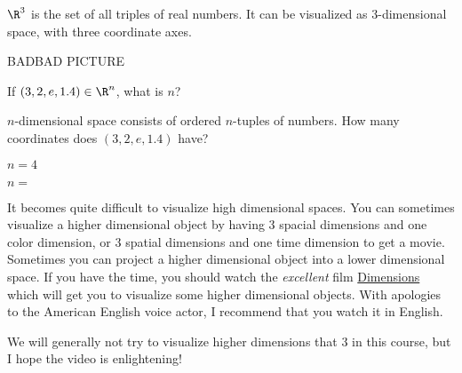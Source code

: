 \documentclass{ximera}
\begin{document}
\begin{example}
	$\R^3$ is the set of all triples of real numbers.  It can be visualized as $3$-dimensional space, with three coordinate axes. 
	
	BADBAD PICTURE
\end{example}


\begin{question}
	If $(3,2,e,1.4) \in \R^n$, what is $n$?
	\begin{solution}
		\begin{hint}
		$n$-dimensional space consists of ordered $n$-tuples of numbers.  How many coordinates does $(3,2,e,1.4)$ have?
		\end{hint}
		\begin{hint}
			$n=4$
		\end{hint}
	$n = $
	\end{solution}
\end{question}

It becomes quite difficult to visualize high dimensional spaces.  
You can sometimes visualize a higher dimensional object by having $3$ spacial dimensions and one color dimension, or $3$ spatial dimensions and one time 
dimension to get a movie.  Sometimes you can project a higher dimensional object into a lower dimensional space.  If you have the time, you should watch the 
\textit{excellent} film \href{http://www.dimensions-math.org/}{Dimensions}  which will get you to visualize some higher dimensional objects.  
With apologies to the American English voice actor, I recommend that you watch it in English.

We will generally not try to visualize higher dimensions that $3$ in this course, but I hope the video is enlightening!



\end{document}
